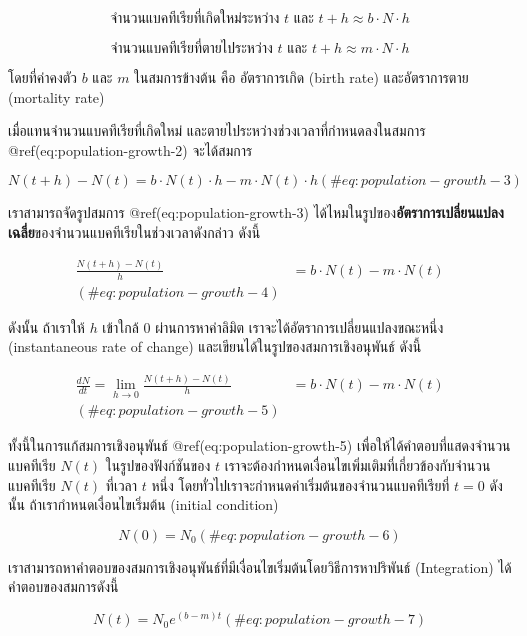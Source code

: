 \documentclass[
]{book}
\begin{document}
\[
\text{จำนวนแบคทีเรียที่เกิดใหม่ระหว่าง } t \text{ และ } t + h \approx b \cdot N \cdot h
\]

\[
\text{จำนวนแบคทีเรียที่ตายไประหว่าง } t \text{ และ } t + h \approx m \cdot N \cdot h
\]

โดยที่ค่าคงตัว \(b\) และ \(m\) ในสมการข้างต้น คือ อัตราการเกิด (birth rate)
และอัตราการตาย (mortality rate)

เมื่อแทนจำนวนแบคทีเรียที่เกิดใหม่ และตายไประหว่างช่วงเวลาที่กำหนดลงในสมการ
@ref(eq:population-growth-2) จะได้สมการ

\begin{equation}
N(t + h) - N(t) = b\cdot N(t) \cdot h - m\cdot N(t) \cdot h
(\#eq:population-growth-3)
\end{equation}

เราสามารถจัดรูปสมการ @ref(eq:population-growth-3)
ได้ไหมในรูปของ\textbf{อัตราการเปลี่ยนแปลงเฉลี่ย}ของจำนวนแบคทีเรียในช่วงเวลาดังกล่าว
ดังนี้

\begin{align}
\frac{N(t + h) - N(t)}{h} &= b\cdot N(t)  - m\cdot N(t)\\
(\#eq:population-growth-4)
\end{align}

ดังนั้น ถ้าเราให้ \(h\) เข้าใกล้ 0 ผ่านการหาค่าลิมิต เราจะได้อัตราการเปลี่ยนแปลงขณะหนึ่ง
(instantaneous rate of change) และเขียนได้ในรูปของสมการเชิงอนุพันธ์ ดังนี้

\begin{align}
\frac{dN}{dt} = \lim_{h \rightarrow 0}\frac{N(t + h) - N(t)}{h} &= b\cdot N(t)  - m\cdot N(t)\\
(\#eq:population-growth-5)
\end{align}

ทั้งนี้ในการแก้สมการเชิงอนุพันธ์ @ref(eq:population-growth-5)
เพื่อให้ได้คำตอบที่แสดงจำนวนแบคทีเรีย \(N(t)\) ในรูปของฟังก์ชันของ \(t\)
เราจะต้องกำหนดเงื่อนไขเพิ่มเติมที่เกี่ยวข้องกับจำนวนแบคทีเรีย \(N(t)\) ที่เวลา \(t\) หนึ่ง
โดยทั่วไปเราจะกำหนดค่าเริ่มต้นของจำนวนแบคทีเรียที่ \(t = 0\) ดังนั้น
ถ้าเรากำหนดเงื่อนไขเริ่มต้น (initial condition)

\begin{equation}
N(0) = N_0
(\#eq:population-growth-6)
\end{equation}

เราสามารถหาคำตอบของสมการเชิงอนุพันธ์ที่มีเงื่อนไขเริ่มต้นโดยวิธีการหาปริพันธ์
(Integration) ได้คำตอบของสมการดังนี้

\begin{equation}
N(t) = N_0 e^{(b-m)t}
(\#eq:population-growth-7)
\end{equation}
\end{document}
